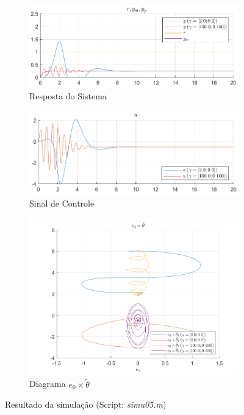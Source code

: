 \documentclass[10pt]{article}
\begin{document}
\begin{figure}[h!]
    \begin{subfigure}[b]{0.45\textwidth}
        \centering
        \includegraphics[width=\textwidth]{img/fig05c.png}
        \caption{Resposta do Sistema}
    \end{subfigure}
    \begin{subfigure}[b]{0.45\textwidth}
        \centering
        \includegraphics[width=\textwidth]{img/fig05e.png}
        \caption{Sinal de Controle}
    \end{subfigure}

    \vspace{0.5cm}

    \begin{subfigure}[b]{0.4\textwidth}
        \centering
        \includegraphics[width=\textwidth]{img/fig05d.png}
        \caption{Diagrama $e_0 \times \tilde{\theta}$}
    \end{subfigure}

    \caption{Resultado da simulação (Script: \textit{simu05.m})}
    \label{fig:sim5}
\end{figure}
\end{document}
